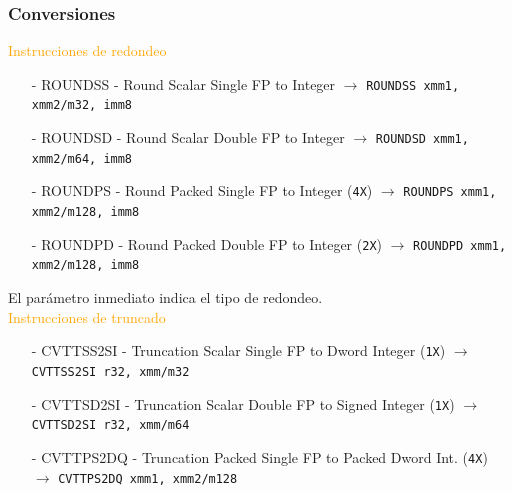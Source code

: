\documentclass[aspectratio=169]{beamer}
\begin{document}
\begin{frame}[fragile]
	\frametitle{Conversiones}
	\normalsize \textcolor{orange}{Instrucciones de redondeo}\\
	\vspace{0.1cm}
	\footnotesize
	\begin{itemize}
	\item[-] {\color{a}ROUND}{\color{v}SS} - Round Scalar Single FP to Integer $\rightarrow$
	\textcolor{verdeuca}{\texttt{ROUNDSS xmm1, xmm2/m32, imm8}}
	\item[-] {\color{a}ROUND}{\color{v}SD} - Round Scalar Double FP to Integer $\rightarrow$
	\textcolor{verdeuca}{\texttt{ROUNDSD xmm1, xmm2/m64, imm8}}
	\item[-] {\color{a}ROUND}{\color{v}PS} - Round Packed Single FP to Integer (\texttt{4X}) $\rightarrow$
	\textcolor{verdeuca}{\texttt{ROUNDPS xmm1, xmm2/m128, imm8}}
	\item[-] {\color{a}ROUND}{\color{v}PD} - Round Packed Double FP to Integer (\texttt{2X}) $\rightarrow$
	\textcolor{verdeuca}{\texttt{ROUNDPD xmm1, xmm2/m128, imm8}}
	\end{itemize}
	El parámetro inmediato indica el tipo de redondeo.\\
	\pause
	\vspace{0.5cm}
	\normalsize \textcolor{orange}{Instrucciones de truncado}\\
	\vspace{0.1cm}
	\footnotesize
	\begin{itemize}
	\item[-] {\color{a}CVT}{\color{orange}T}{\color{v}SS}{\color{orange}2}{\color{v}SI} - Truncation Scalar Single FP to Dword Integer (\texttt{1X}) $\rightarrow$
	\textcolor{verdeuca}{\texttt{CVTTSS2SI r32, xmm/m32}}
	\item[-] {\color{a}CVT}{\color{orange}T}{\color{v}SD}{\color{orange}2}{\color{v}SI} - Truncation Scalar Double FP to Signed Integer (\texttt{1X}) $\rightarrow$
	\textcolor{verdeuca}{\texttt{CVTTSD2SI r32, xmm/m64}}
	\item[-] {\color{a}CVT}{\color{orange}T}{\color{v}PS}{\color{orange}2}{\color{v}DQ} - Truncation Packed Single FP to Packed Dword Int. (\texttt{4X}) $\rightarrow$
	\textcolor{verdeuca}{\texttt{CVTTPS2DQ xmm1, xmm2/m128}}
	\end{itemize}
\end{frame}
\end{document}
